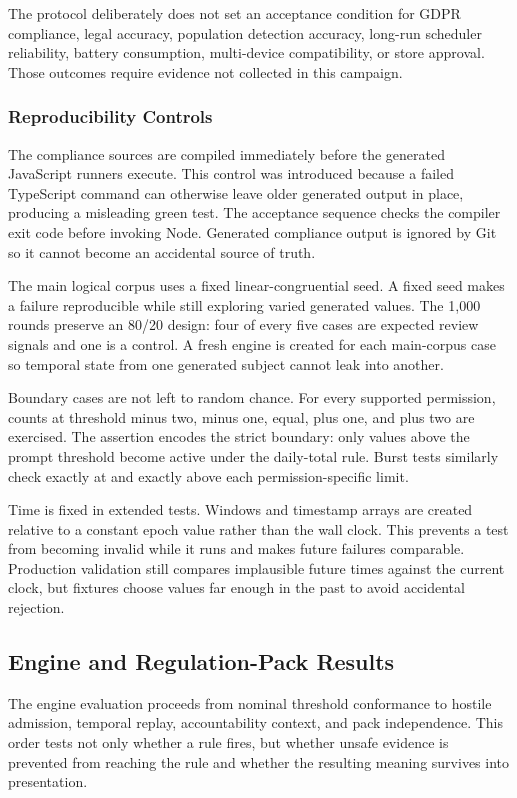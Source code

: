 The protocol deliberately does not set an acceptance condition for GDPR compliance, legal accuracy, population detection accuracy, long-run scheduler reliability, battery consumption, multi-device compatibility, or store approval. Those outcomes require evidence not collected in this campaign.

\subsubsection{Reproducibility Controls}

The compliance sources are compiled immediately before the generated JavaScript runners execute. This control was introduced because a failed TypeScript command can otherwise leave older generated output in place, producing a misleading green test. The acceptance sequence checks the compiler exit code before invoking Node. Generated compliance output is ignored by Git so it cannot become an accidental source of truth.

The main logical corpus uses a fixed linear-congruential seed. A fixed seed makes a failure reproducible while still exploring varied generated values. The 1,000 rounds preserve an 80/20 design: four of every five cases are expected review signals and one is a control. A fresh engine is created for each main-corpus case so temporal state from one generated subject cannot leak into another.

Boundary cases are not left to random chance. For every supported permission, counts at threshold minus two, minus one, equal, plus one, and plus two are exercised. The assertion encodes the strict boundary: only values above the prompt threshold become active under the daily-total rule. Burst tests similarly check exactly at and exactly above each permission-specific limit.

Time is fixed in extended tests. Windows and timestamp arrays are created relative to a constant epoch value rather than the wall clock. This prevents a test from becoming invalid while it runs and makes future failures comparable. Production validation still compares implausible future times against the current clock, but fixtures choose values far enough in the past to avoid accidental rejection.

\subsection{Engine and Regulation-Pack Results}

The engine evaluation proceeds from nominal threshold conformance to hostile admission, temporal replay, accountability context, and pack independence. This order tests not only whether a rule fires, but whether unsafe evidence is prevented from reaching the rule and whether the resulting meaning survives into presentation.


